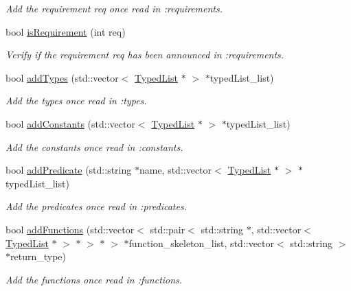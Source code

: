 \begin{DoxyCompactItemize}
\begin{DoxyCompactList}\small\item\em Add the requirement req once read in \+:requirements. \end{DoxyCompactList}\item 
bool \hyperlink{classParser_a2963392154c748d42f9050700d28f1b3}{is\+Requirement} (int req)
\begin{DoxyCompactList}\small\item\em Verify if the requirement req has been announced in \+:requirements. \end{DoxyCompactList}\item 
bool \hyperlink{classParser_af729ba7522ed318d4815c05d220cf3f2}{add\+Types} (std\+::vector$<$ \hyperlink{classTypedList}{Typed\+List} $\ast$ $>$ $\ast$typed\+List\+\_\+list)
\begin{DoxyCompactList}\small\item\em Add the types once read in \+:types. \end{DoxyCompactList}\item 
bool \hyperlink{classParser_a8a0cab70a42a5864b1c88e52ea67bdbc}{add\+Constants} (std\+::vector$<$ \hyperlink{classTypedList}{Typed\+List} $\ast$ $>$ $\ast$typed\+List\+\_\+list)
\begin{DoxyCompactList}\small\item\em Add the constants once read in \+:constants. \end{DoxyCompactList}\item 
bool \hyperlink{classParser_a2bb6e04284ea6e2169672c6de405f665}{add\+Predicate} (std\+::string $\ast$name, std\+::vector$<$ \hyperlink{classTypedList}{Typed\+List} $\ast$ $>$ $\ast$typed\+List\+\_\+list)
\begin{DoxyCompactList}\small\item\em Add the predicates once read in \+:predicates. \end{DoxyCompactList}\item 
bool \hyperlink{classParser_ac19e3969c2c41180cf1ed2e9e99a780a}{add\+Functions} (std\+::vector$<$ std\+::pair$<$ std\+::string $\ast$, std\+::vector$<$ \hyperlink{classTypedList}{Typed\+List} $\ast$ $>$ $\ast$ $>$ $\ast$ $>$ $\ast$function\+\_\+skeleton\+\_\+list, std\+::vector$<$ std\+::string $>$ $\ast$return\+\_\+type)
\begin{DoxyCompactList}\small\item\em Add the functions once read in \+:functions. \end{DoxyCompactList}\item 

\end{DoxyCompactItemize}
